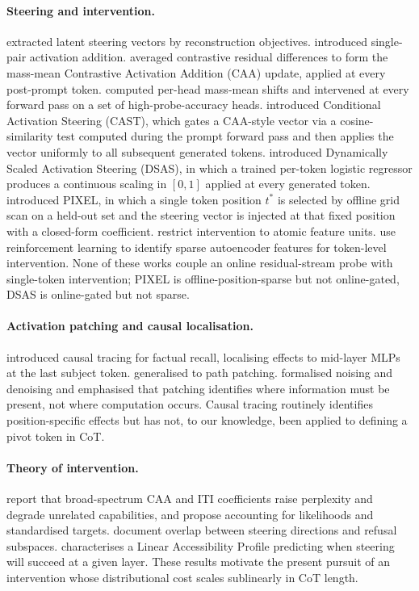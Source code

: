 \documentclass[11pt]{article}
\theoremstyle{definition}
\newcommand{\1}{\mathbf{1}}
\begin{document}
\paragraph{Steering and intervention.} \citet{subramani2022steering} extracted latent steering vectors by reconstruction objectives. \citet{turner2023actadd} introduced single-pair activation addition. \citet{panickssery2023caa} averaged contrastive residual differences to form the mass-mean Contrastive Activation Addition (CAA) update, applied at every post-prompt token. \citet{li2023iti} computed per-head mass-mean shifts and intervened at every forward pass on a set of high-probe-accuracy heads. \citet{lee2024cast} introduced Conditional Activation Steering (CAST), which gates a CAA-style vector via a cosine-similarity test computed during the prompt forward pass and then applies the vector uniformly to all subsequent generated tokens. \citet{ferrando2025dsas} introduced Dynamically Scaled Activation Steering (DSAS), in which a trained per-token logistic regressor produces a continuous scaling in $[0,1]$ applied at every generated token. \citet{yu2025pixel} introduced PIXEL, in which a single token position $t^{\ast}$ is selected by offline grid scan on a held-out set and the steering vector is injected at that fixed position with a closed-form coefficient. \citet{feng2026austeer} restrict intervention to atomic feature units. \citet{cho2026controlrl} use reinforcement learning to identify sparse autoencoder features for token-level intervention. None of these works couple an online residual-stream probe with single-token intervention; PIXEL is offline-position-sparse but not online-gated, DSAS is online-gated but not sparse.

\paragraph{Activation patching and causal localisation.} \citet{meng2022rome} introduced causal tracing for factual recall, localising effects to mid-layer MLPs at the last subject token. \citet{goldowskydill2023patching} generalised to path patching. \citet{heimersheim2024patching} formalised noising and denoising and emphasised that patching identifies where information must be present, not where computation occurs. Causal tracing routinely identifies position-specific effects but has not, to our knowledge, been applied to defining a pivot token in CoT.

\paragraph{Theory of intervention.} \citet{pres2024reliable} report that broad-spectrum CAA and ITI coefficients raise perplexity and degrade unrelated capabilities, and propose accounting for likelihoods and standardised targets. \citet{li2026safety} document overlap between steering directions and refusal subspaces. \citet{billa2026lap} characterises a Linear Accessibility Profile predicting when steering will succeed at a given layer. These results motivate the present pursuit of an intervention whose distributional cost scales sublinearly in CoT length.
\end{document}
